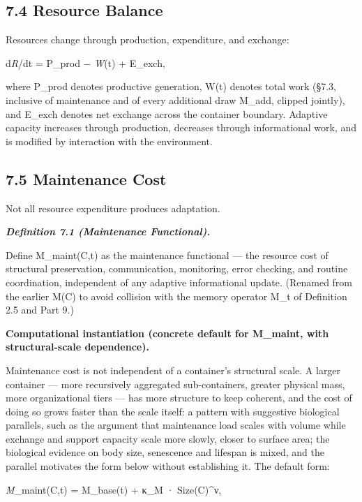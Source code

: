\documentclass[
]{article}
\begin{document}
\hypertarget{resource-balance}{%
\subsection{7.4 Resource Balance}\label{resource-balance}}

Resources change through production, expenditure, and exchange:

d\emph{R}/dt = P\_prod − \emph{W}(t) + E\_exch,

where P\_prod denotes productive generation, W(t) denotes total work
(§7.3, inclusive of maintenance and of every additional draw M\_add,
clipped jointly), and E\_exch denotes net exchange across the container
boundary. Adaptive capacity increases through production, decreases
through informational work, and is modified by interaction with the
environment.

\hypertarget{maintenance-cost}{%
\subsection{7.5 Maintenance Cost}\label{maintenance-cost}}

Not all resource expenditure produces adaptation.

\emph{\textbf{Definition 7.1 (Maintenance Functional).}}

Define M\_maint(C,t) as the maintenance functional --- the resource cost
of structural preservation, communication, monitoring, error checking,
and routine coordination, independent of any adaptive informational
update. (Renamed from the earlier M(C) to avoid collision with the
memory operator M\_t of Definition 2.5 and Part 9.)

\textbf{Computational instantiation (concrete default for M\_maint, with
structural-scale dependence).}

Maintenance cost is not independent of a container's structural scale. A
larger container --- more recursively aggregated sub-containers, greater
physical mass, more organizational tiers --- has more structure to keep
coherent, and the cost of doing so grows faster than the scale itself: a
pattern with suggestive biological parallels, such as the argument that
maintenance load scales with volume while exchange and support capacity
scale more slowly, closer to surface area; the biological evidence on
body size, senescence and lifespan is mixed, and the parallel motivates
the form below without establishing it. The default form:

\emph{M}\_maint(C,t) = M\_base(t) + κ\_M · Size(C)\^{}ν,
\end{document}
